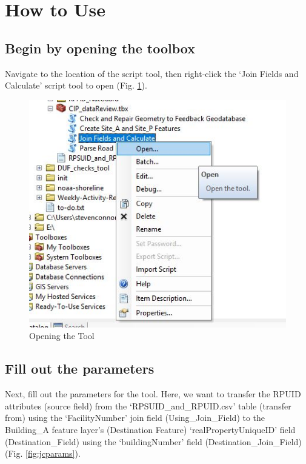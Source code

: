 \documentclass[openany]{book}
\theoremstyle{definition}
\theoremstyle{definition}
\theoremstyle{definition}
\theoremstyle{remark}
\begin{document}
\section{How to Use}\label{how-to-use-1}

\subsection{Begin by opening the
toolbox}\label{begin-by-opening-the-toolbox-1}

Navigate to the location of the script tool, then right-click the `Join
Fields and Calculate' script tool to open (Fig. \ref{fig:jcopen}).

\begin{figure}[H]

{\centering \includegraphics{figures/joinCalcopentool} 

}

\caption{Opening the Tool}\label{fig:jcopen}
\end{figure}

\subsection{Fill out the parameters}\label{fill-out-the-parameters-1}

Next, fill out the parameters for the tool. Here, we want to transfer
the RPUID attributes (source field) from the `RPSUID\_and\_RPUID.csv'
table (transfer from) using the `FacilityNumber' join field
(Using\_Join\_Field) to the Building\_A feature layer's (Destination
Feature) `realPropertyUniqueID' field (Destination\_Field) using the
`buildingNumber' field (Destination\_Join\_Field) (Fig.
\ref{fig:jcparams}).
\end{document}
